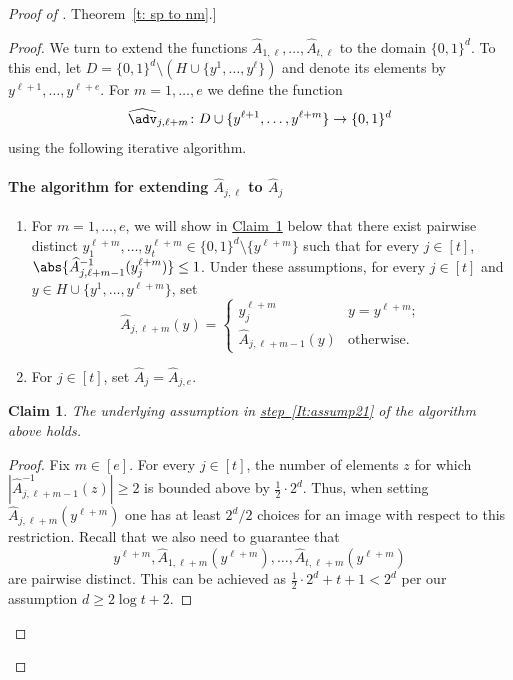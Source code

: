 \documentclass[11pt]{article}
\numberwithin{equation}{section}
\newtheorem{claim}[theorem]{Claim}
\theoremstyle{definition}
\theoremstyle{plain}
\newcommand{\expref}[2]{\hyperref[#2]{#1~\ref{#2}}}
\newcommand{\expeqref}[2]{\hyperref[#2]{#1~\eqref{#2}}}
\begin{document}
\begin{proof}[Proof of \expref{Theorem}{t: sp to nm}.]
\begin{proof}
We turn to extend the functions $\widehat{A}_{1,\ell}, \ldots, \widehat{A}_{t,\ell}$ to the domain $\{0,1\}^d$. To this end,
let $D = \{0,1\}^d \setminus (H \cup \{y^1,\ldots,y^\ell\})$ and denote its elements by $y^{\ell+1},\ldots,y^{\ell+e}$. For $m=1,\ldots,e$ we define the function \[
\widehat{\adv}_{j,\ell+m} \colon D \cup \{y^{\ell+1},\ldots, y^{\ell+m}\} \to \{0,1\}^d
\]
using the following iterative algorithm.

%
\paragraph{The algorithm for extending $\widehat{A}_{j,\ell}$ to $\widehat{A}_{j}$}
\begin{enumerate}
%
	\item\label{It:assump21} For $m = 1,\ldots, e$, we will show in \expref{Claim}{c:step 3} below that there exist pairwise distinct $y^{\ell+m}_{1},\ldots,y^{\ell+m}_{t}\in \{0,1\}^d \setminus \{y^{\ell+m}\}$ such that for every $j \in [t]$, $\abs{\widehat{A}_{j,\ell+m-1}^{-1}(y^{\ell+m}_{j})} \le 1$. Under these assumptions, for every $j \in [t]$ and $y \in H \cup \{y^{1},\ldots, y^{\ell+m}\}$, set 
	\[\widehat{A}_{j,\ell+m}(y) = \begin{cases}
	y^{\ell+m}_{j} &  y = y^{\ell+m}; \\
	\widehat{A}_{j,\ell+m-1}(y) & \text{otherwise}.
	\end{cases}\]
	\item\label{It:assump22} For $j \in [t]$, set $\widehat{A}_{j} = \widehat{A}_{j,e}$.
	

	
\end{enumerate}

\begin{claim}\label{c:step 3}
	The underlying assumption in \expeqref{step}{It:assump21} of the algorithm above holds.
\end{claim}

\begin{proof}
	Fix $m \in [e]$. For every $j \in [t]$, the number of elements $z$ for which $|\widehat{A}^{-1}_{j,\ell+m-1}(z)| \ge 2$ is bounded above by $\frac1{2} \cdot 2^d$. Thus, when setting $\widehat{A}_{j,\ell+m}(y^{\ell+m})$ one has at least $2^d/2$ choices for an image with respect to this restriction. Recall that we also need to guarantee that
	\[
	y^{\ell+m}, \widehat{A}_{1,\ell+m}(y^{\ell+m}),\ldots,\widehat{A}_{t,\ell+m}(y^{\ell+m})\]
	are pairwise distinct. This can be achieved as $\frac1{2} \cdot 2^d+t+1 < 2^d$ per our assumption $d \ge 2\log{t}+2$.
\end{proof}


\end{proof}
\end{proof}
\end{document}
